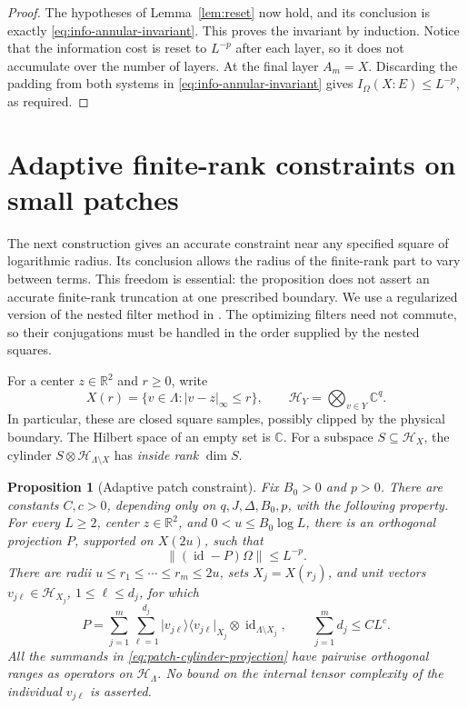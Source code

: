 \documentclass[11pt]{article}
\numberwithin{equation}{section}
\newtheorem{proposition}[theorem]{Proposition}
\theoremstyle{definition}
\theoremstyle{remark}
\begin{document}
\begin{proof}
The hypotheses of Lemma~\ref{lem:reset} now hold, and its conclusion
is exactly \eqref{eq:info-annular-invariant}.  This proves the invariant
by induction.  Notice that the information cost is reset to $L^{-p}$
after each layer, so it does not accumulate over the number of layers.
At the final layer $A_m=X$.  Discarding the padding from both systems
in \eqref{eq:info-annular-invariant} gives
$I_\Omega(X:E)\le L^{-p}$, as required.
\end{proof}

\section{Adaptive finite-rank constraints on small patches}
\label{sec:patches}

The next construction gives an accurate constraint near any specified
square of logarithmic radius.  Its conclusion allows the radius of the
finite-rank part to vary between terms.  This freedom is essential:
the proposition does not assert an accurate finite-rank truncation at
one prescribed boundary.  We use a regularized version of the nested
filter method in \cite{RepoAreaLaw}.  The optimizing filters need not
commute, so their conjugations must be handled in the order supplied by
the nested squares.

For a center \(z\in\mathbb R^2\) and \(r\geq 0\), write
\[
 X(r)=\{v\in\Lambda:\lvert v-z\rvert_\infty\leq r\},
 \qquad
 \mathcal H_Y=\bigotimes_{v\in Y}\mathbb C^q.
\]
In particular, these are closed square samples, possibly clipped by the
physical boundary.  The Hilbert space of an empty set is \(\mathbb C\).
For a subspace $S\subseteq\mathcal H_X$, the cylinder
$S\otimes\mathcal H_{\Lambda\setminus X}$ has \emph{inside rank} $\dim S$.

\begin{proposition}[Adaptive patch constraint]
\label{prop:patch}
Fix \(B_0>0\) and \(p>0\).  There are constants \(C,c>0\), depending
only on \(q,J,\Delta,B_0,p\), with the following property.  For every
\(L\geq2\), center \(z\in\mathbb R^2\), and
\(0<u\leq B_0\log L\), there is an orthogonal projection \(P\),
supported on \(X(2u)\), such that
\[
 \lVert (\operatorname{id}-P)\Omega\rVert\leq L^{-p}.
\]
There are radii \(u\leq r_1\leq\cdots\leq r_m\leq2u\), sets
\(X_j=X(r_j)\), and unit vectors
\(v_{j\ell}\in\mathcal H_{X_j}\), \(1\leq\ell\leq d_j\), for which
\begin{equation}
 P=\sum_{j=1}^m\sum_{\ell=1}^{d_j}
       \lvert v_{j\ell}\rangle\langle v_{j\ell}\rvert_{X_j}
          \otimes\operatorname{id}_{\Lambda\setminus X_j},
 \qquad
 \sum_{j=1}^m d_j\leq C L^c.
 \label{eq:patch-cylinder-projection}
\end{equation}
All the summands in \eqref{eq:patch-cylinder-projection} have pairwise
orthogonal ranges as operators on \(\mathcal H_\Lambda\).
No bound on the internal tensor complexity of the individual
\(v_{j\ell}\) is asserted.
\end{proposition}
\end{document}
